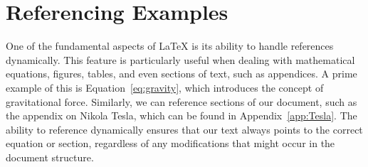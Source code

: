 \section{Referencing Examples}

One of the fundamental aspects of LaTeX is its ability to handle references dynamically. This feature is particularly useful when dealing with mathematical equations, figures, tables, and even sections of text, such as appendices. A prime example of this is Equation~\ref{eq:gravity}, which introduces the concept of gravitational force. Similarly, we can reference sections of our document, such as the appendix on Nikola Tesla, which can be found in Appendix~\ref{app:Tesla}. The ability to reference dynamically ensures that our text always points to the correct equation or section, regardless of any modifications that might occur in the document structure.


